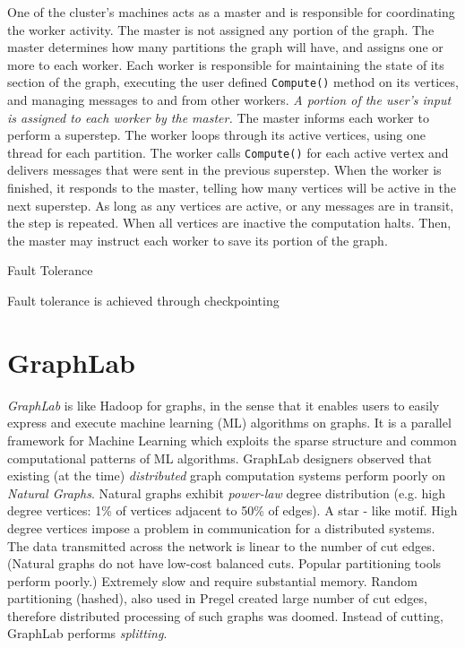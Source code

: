 \documentclass[letterpaper,twocolumn,10pt]{article}
\begin{document}
One of the cluster's machines acts as a master and is responsible for coordinating the worker activity. The master is not assigned any portion of the graph.
The master determines how many partitions the graph will have, and assigns one or more to each worker. 
Each worker is responsible for maintaining the state of its section of the graph, executing the user defined {\tt Compute()} method on its vertices, and managing messages to and from other workers.
\textit{A portion of the user's input is assigned to each worker by the master.}
The master informs each worker to perform a superstep. The worker loops through its active vertices, using one thread for each partition. The worker calls {\tt Compute()} for each active vertex and delivers messages that were sent in the previous superstep.
When the worker is finished, it responds to the master, telling how many vertices will be active in the next superstep. As long as any vertices are active, or any messages are in transit, the step is repeated.
When all vertices are inactive the computation halts. Then, the master may instruct each worker to save its portion of the graph.

Fault Tolerance

Fault tolerance is achieved through checkpointing

\section{GraphLab}
\textit{GraphLab} is like Hadoop for graphs, in the sense that it enables users to easily express and execute machine learning (ML) algorithms on graphs.
It is a parallel framework for Machine Learning which exploits the sparse structure and common computational patterns of ML algorithms. 
GraphLab designers observed that existing (at the time) \textit{distributed} graph computation systems perform poorly on \textit{Natural Graphs}. Natural graphs exhibit \textit{power-law} degree distribution (e.g. high degree vertices: 1\% of vertices adjacent to 50\% of edges). A star - like motif. High degree vertices impose a problem in communication for a distributed systems. The data transmitted across the network is linear to the number of cut edges.
(Natural graphs do not have low-cost balanced cuts. Popular partitioning tools perform poorly.) Extremely slow and require substantial memory.
Random partitioning (hashed), also used in Pregel created large number of cut edges, therefore distributed processing of such graphs was doomed. Instead of cutting, GraphLab performs \textit{splitting}.
\end{document}
